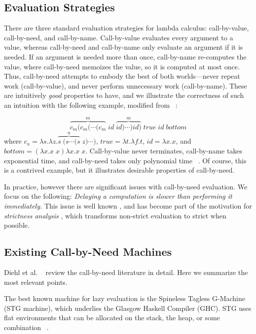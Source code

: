 \subsection{Evaluation Strategies} \label{sec:eval}

There are three standard evaluation strategies for lambda calculus:
call-by-value, call-by-need, and call-by-name.  Call-by-value evaluates every argument
to a value, whereas call-by-need and call-by-name only evaluate an argument if
it is needed.  If an argument is needed more than once, call-by-name re-computes
the value, where call-by-need memoizes the value, so it is computed at most once.
Thus, call-by-need attempts to embody the best of both worlds---never repeat
work (call-by-value), and never perform unnecessary work (call-by-name). These
are intuitively \emph{good} properties to have, and we illustrate the
correctness of such an intuition with the following example, modified from
~\cite{danvy2013synthetic}:

$$ \overbrace{c_m (c_m (\cdots(c_m}^{m} \; id \; \overbrace{id)\cdots) id)}^{m} \; true \; id
\; bottom $$ where $c_n = \lambda s.\lambda z.\overbrace{s \; (s \cdots (s}^{n}
\; z) \cdots) $, $true = \lambda t.\lambda f.t$, $id=\lambda x.x$, and $bottom =
(\lambda x.x \; x) \lambda x.x \; x$. Call-by-value never terminates,
call-by-name takes exponential time, and call-by-need takes only polynomial time
~\cite{danvy2013synthetic}. Of course, this is a contrived example, but it
illustrates desirable properties of call-by-need.

In practice, however there are significant issues with call-by-need evaluation.
We focus on the following: \emph{Delaying a computation is slower than
performing it immediately.} This issue is well known
\cite{johnsson1984efficient,jonesstg}, and has become part of the motivation
for \emph{strictness analysis}
\cite{mycroft1982abstract,wadler1987projections}, which transforms non-strict
evaluation to strict when possible.

\subsection{Existing Call-by-Need Machines}

Diehl et al. ~\cite{diehl2000abstract} review the call-by-need
literature in detail.  Here we summarize the most relevant points.

The best known machine for lazy evaluation is the Spineless Tagless
G-Machine (STG machine), which underlies the Glasgow Haskell Compiler (GHC). 
STG uses flat environments that can be allocated on the stack, the heap,
or some combination ~\cite{jonesstg}.  

